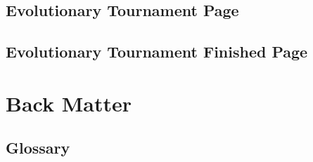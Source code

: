 \documentclass[openany]{book}
\begin{document}
\chapter{Evolutionary Tournament Page}


\chapter{Evolutionary Tournament Finished Page}


\part{Back Matter}

\chapter*{Glossary}

\end{document}
